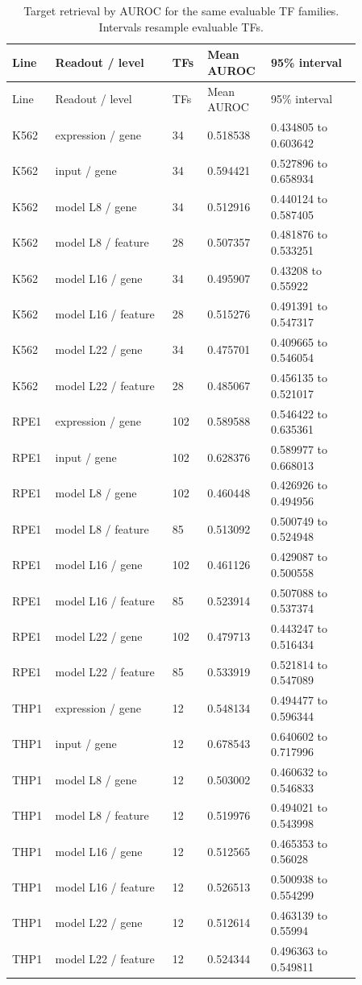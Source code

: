 \begin{longtable}{@{}L{0.07\linewidth}L{0.31\linewidth}L{0.09\linewidth}L{0.15\linewidth}L{0.24\linewidth}@{}}
\caption{Target retrieval by AUROC for the same evaluable TF families. Intervals resample evaluable TFs.}\\
\toprule
Line & Readout / level & TFs & Mean AUROC & 95\% interval \\
\midrule
\endfirsthead
\toprule
Line & Readout / level & TFs & Mean AUROC & 95\% interval \\
\midrule
\endhead
\endfoot
\bottomrule
\endlastfoot
K562 & expression / gene & 34 & 0.518538 & 0.434805 to 0.603642 \\
K562 & input / gene & 34 & 0.594421 & 0.527896 to 0.658934 \\
K562 & model L8 / gene & 34 & 0.512916 & 0.440124 to 0.587405 \\
K562 & model L8 / feature & 28 & 0.507357 & 0.481876 to 0.533251 \\
K562 & model L16 / gene & 34 & 0.495907 & 0.43208 to 0.55922 \\
K562 & model L16 / feature & 28 & 0.515276 & 0.491391 to 0.547317 \\
K562 & model L22 / gene & 34 & 0.475701 & 0.409665 to 0.546054 \\
K562 & model L22 / feature & 28 & 0.485067 & 0.456135 to 0.521017 \\
RPE1 & expression / gene & 102 & 0.589588 & 0.546422 to 0.635361 \\
RPE1 & input / gene & 102 & 0.628376 & 0.589977 to 0.668013 \\
RPE1 & model L8 / gene & 102 & 0.460448 & 0.426926 to 0.494956 \\
RPE1 & model L8 / feature & 85 & 0.513092 & 0.500749 to 0.524948 \\
RPE1 & model L16 / gene & 102 & 0.461126 & 0.429087 to 0.500558 \\
RPE1 & model L16 / feature & 85 & 0.523914 & 0.507088 to 0.537374 \\
RPE1 & model L22 / gene & 102 & 0.479713 & 0.443247 to 0.516434 \\
RPE1 & model L22 / feature & 85 & 0.533919 & 0.521814 to 0.547089 \\
THP1 & expression / gene & 12 & 0.548134 & 0.494477 to 0.596344 \\
THP1 & input / gene & 12 & 0.678543 & 0.640602 to 0.717996 \\
THP1 & model L8 / gene & 12 & 0.503002 & 0.460632 to 0.546833 \\
THP1 & model L8 / feature & 12 & 0.519976 & 0.494021 to 0.543998 \\
THP1 & model L16 / gene & 12 & 0.512565 & 0.465353 to 0.56028 \\
THP1 & model L16 / feature & 12 & 0.526513 & 0.500938 to 0.554299 \\
THP1 & model L22 / gene & 12 & 0.512614 & 0.463139 to 0.55994 \\
THP1 & model L22 / feature & 12 & 0.524344 & 0.496363 to 0.549811 \\
\end{longtable}
